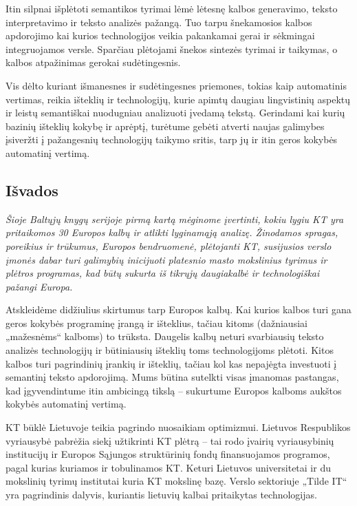 \begin{multicols}{2}
  Itin silpnai išplėtoti semantikos tyrimai lėmė lėtesnę kalbos generavimo, teksto interpretavimo ir teksto analizės pažangą. Tuo tarpu šnekamosios kalbos apdorojimo kai kurios technologijos veikia pakankamai gerai ir sėkmingai integruojamos versle. Sparčiau plėtojami šnekos sintezės tyrimai ir taikymas, o kalbos atpažinimas gerokai sudėtingesnis.   

    Vis dėlto kuriant išmanesnes ir sudėtingesnes priemones, tokias kaip automatinis vertimas, reikia išteklių ir technologijų, kurie apimtų daugiau lingvistinių aspektų ir leistų semantiškai  nuodugniau analizuoti įvedamą tekstą. Gerindami kai kurių bazinių išteklių kokybę ir aprėptį, turėtume gebėti atverti naujas galimybes įsiveržti į pažangesnių technologijų taikymo sritis, tarp jų ir itin geros kokybės automatinį vertimą.

\subsection{Išvados}

\textit{Šioje Baltųjų knygų serijoje pirmą kartą mėginome įvertinti, kokiu lygiu KT yra pritaikomos 30 Europos kalbų ir atlikti lyginamąją analizę. Žinodamos spragas, poreikius ir trūkumus, Europos bendruomenė, plėtojanti KT, susijusios verslo įmonės dabar turi galimybių inicijuoti platesnio masto mokslinius tyrimus ir plėtros programas, kad būtų sukurta iš tikrųjų daugiakalbė ir technologiškai pažangi Europa.}

Atskleidėme didžiulius skirtumus tarp Europos kalbų. Kai kurios kalbos turi gana geros kokybės programinę įrangą ir išteklius, tačiau kitoms (dažniausiai „mažesnėms“ kalboms) to trūksta. Daugelis kalbų neturi svarbiausių teksto analizės technologijų ir būtiniausių išteklių toms technologijoms plėtoti. Kitos kalbos turi pagrindinių įrankių ir išteklių, tačiau kol kas nepajėgta investuoti į semantinį teksto apdorojimą. Mums būtina sutelkti visas įmanomas pastangas, kad įgyvendintume itin ambicingą tikslą – sukurtume Europos kalboms aukštos kokybės automatinį vertimą.   

    KT būklė Lietuvoje teikia pagrindo nuosaikiam optimizmui. Lietuvos Respublikos vyriausybė pabrėžia siekį užtikrinti KT plėtrą – tai rodo įvairių vyriausybinių institucijų ir Europos Sąjungos struktūrinių fondų finansuojamos programos, pagal kurias kuriamos ir tobulinamos KT. Keturi Lietuvos universitetai ir du mokslinių tyrimų institutai kuria KT mokslinę bazę. Verslo sektoriuje „Tilde IT“ yra pagrindinis dalyvis, kuriantis lietuvių kalbai pritaikytas technologijas.   


\end{multicols}

